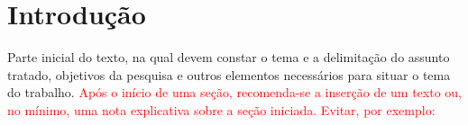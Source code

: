 
\chapter{Introdução}\label{cap:introducao}

Parte inicial do texto, na qual devem constar o tema e a delimitação do assunto tratado, objetivos da pesquisa e outros elementos necessários para situar o tema do trabalho. \textcolor{red}{Após o início de uma seção, recomenda-se a inserção de um texto ou, no mínimo, uma nota explicativa sobre a seção iniciada. Evitar, por exemplo:}















